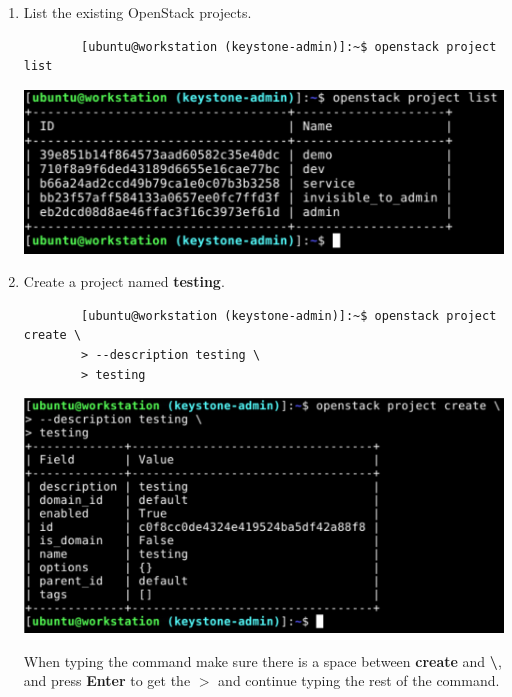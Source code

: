 \documentclass[letterpaper, 12pt]{article}
\begin{document}
\begin{enumerate}
    \item List the existing OpenStack projects.
    \begin{lstlisting}
        [ubuntu@workstation (keystone-admin)]:~$ openstack project list
    \end{lstlisting}

    \begin{center}
        \includegraphics[width=\linewidth]{images/part2/step3.png}
    \end{center}

    \item Create a project named \textbf{testing}.
    \begin{lstlisting}
        [ubuntu@workstation (keystone-admin)]:~$ openstack project create \
        > --description testing \
        > testing
    \end{lstlisting}

    \begin{center}
        \includegraphics[width=\linewidth]{images/part2/step4.png}
    \end{center}

    \begin{tipbox}
        When typing the command make sure there is a space between \textbf{create} and \textbf{\textbackslash}, and
        press \textbf{Enter} to get the \textbf{$>$} and continue typing the rest of the command.
    \end{tipbox}


\end{enumerate}
\end{document}
